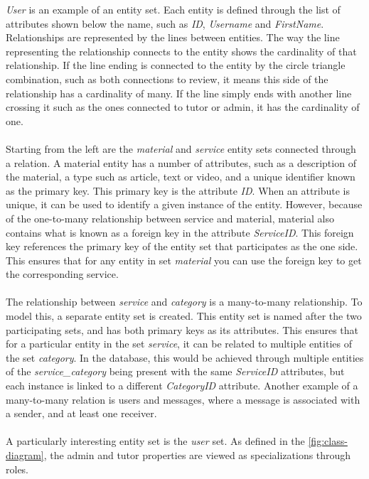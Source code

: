 \textit{User} is an example of an entity set.
Each entity is defined through the list of attributes shown below the name, such as \textit{ID}, \textit{Username} and \textit{FirstName}.
Relationships are represented by the lines between entities.
The way the line representing the relationship connects to the entity shows the cardinality of that relationship.
If the line ending is connected to the entity by the circle triangle combination, such as both connections to review, it means this side of the relationship has a cardinality of many.
If the line simply ends with another line crossing it such as the ones connected to tutor or admin, it has the cardinality of one.
\\\\
Starting from the left are the \textit{material} and \textit{service} entity sets connected through a relation.
A material entity has a number of attributes, such as a description of the material, a type such as article, text or video, and a unique identifier known as the primary key.
This primary key is the attribute \textit{ID}.
When an attribute is unique, it can be used to identify a given instance of the entity.
However, because of the one-to-many relationship between service and material, material also contains what is known as a foreign key in the attribute \textit{ServiceID}.
This foreign key references the primary key of the entity set that participates as the one side.
This ensures that for any entity in set \textit{material} you can use the foreign key to get the corresponding service.
\\\\
The relationship between \textit{service} and \textit{category} is a many-to-many relationship.
To model this, a separate entity set is created.
This entity set is named after the two participating sets, and has both primary keys as its attributes.
This ensures that for a particular entity in the set \textit{service}, it can be related to multiple entities of the set \textit{category}.
In the database, this would be achieved through multiple entities of the \textit{service\_category} being present with the same \textit{ServiceID} attributes, but each instance is linked to a different \textit{CategoryID} attribute.
Another example of a many-to-many relation is users and messages, where a message is associated with a sender, and at least one receiver.
\\\\
A particularly interesting entity set is the \textit{user} set.
As defined in the \autoref{fig:class-diagram}, the admin and tutor properties are viewed as specializations through roles.
